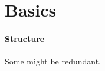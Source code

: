 \documentclass[a4paper,dvipsnames, 11pt]{amsart} %
\begin{document}
\maketitle
\begin{abstract}
\end{abstract}
\section{}




\section{Basics}
\paragraph{Structure}
Some might be redundant.
\end{document}

